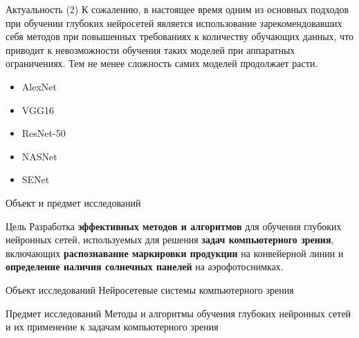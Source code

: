 \documentclass[10pt]{beamer}
\begin{document}
        \begin{frame}{Актуальность (2)}
            К сожалению, в настоящее время одним из основных подходов при обучении глубоких нейросетей является использование зарекомендовавших себя методов при повышенных требованиях к количеству обучающих данных, что приводит к невозможности обучения таких моделей при аппаратных ограничениях. Тем не менее сложность самих моделей продолжает расти.

            \begin{itemize}
                \item AlexNet
                \item VGG16
                \item ResNet-50
                \item NASNet
                \item SENet
            \end{itemize}
        \end{frame}

        \begin{frame}{Объект и предмет исследований}
            \begin{block}{Цель}
                \large
                Разработка \textbf{эффективных методов и алгоритмов} для обучения глубоких нейронных сетей, используемых для решения \textbf{задач компьютерного зрения}, включающих \textbf{распознавание маркировки продукции} на конвейерной линии и \textbf{определение наличия солнечных панелей} на аэрофотоснимках.
            \end{block}

            \begin{block}{Объект исследований}
                Нейросетевые системы компьютерного зрения
            \end{block}

            \begin{block}{Предмет исследований}
                Методы и алгоритмы обучения глубоких нейронных сетей и их применение к задачам компьютерного зрения
            \end{block}
        \end{frame}

\end{document}

